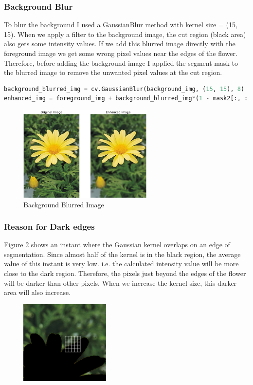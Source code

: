 \documentclass[a4paper]{article}
\begin{document}
\subsubsection*{Background Blur}
To blur the background I used a GaussianBlur method with kernel size
  = (15, 15). When we apply a filter to the background image, the cut
   region (black area) also gets some intensity values. If we add this
    blurred image directly with the foreground image we get some wrong
     pixel values near the edges of the flower. Therefore, before adding
      the background image I applied the segment mask to the blurred
       image to remove the unwanted pixel values at the cut region.
\begin{lstlisting}[language=python]
background_blurred_img = cv.GaussianBlur(background_img, (15, 15), 8)
enhanced_img = foreground_img + background_blurred_img*(1 - mask2[:, :, np.newaxis])
\end{lstlisting}
\begin{figure}[!htb]
    \centering
    \includegraphics[width=0.6\textwidth]{../q72.png}
    \caption{Background Blurred Image}
    \label{figq72}
\end{figure}
\subsubsection*{Reason for Dark edges}
Figure \ref{figq73} shows an instant where the Gaussian kernel overlaps on an edge
 of segmentation. Since almost half of the kernel is in the black region,
  the average value of this instant is very low. i.e. the calculated
   intensity value will be more close to the dark region. Therefore,
    the pixels just beyond the edges of the flower will be darker than
     other pixels. When we increase the kernel size, this darker area
      will also increase.


\begin{figure}[!htb]
    \centering
    \includegraphics[width=0.4\textwidth]{../q73.png}
    \caption{}
    \label{figq73}
\end{figure}
\end{document}
